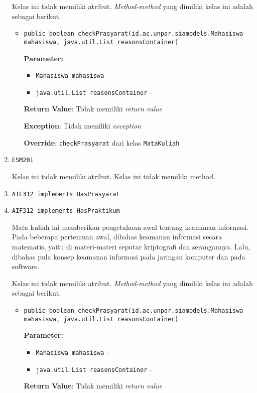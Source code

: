 \documentclass{article}
\begin{document}
\begin{enumerate}
Kelas ini tidak memiliki atribut. \textit{Method-method} yang dimiliki kelas ini adalah sebagai berikut.
\begin{itemize}
\item \texttt{public boolean checkPrasyarat(id.ac.unpar.siamodels.Mahasiswa mahasiswa, java.util.List reasonsContainer)}



\textbf{Parameter:}
\begin{itemize}
\item \texttt{Mahasiswa mahasiswa} - 
\item \texttt{java.util.List reasonsContainer} - 
\end{itemize}
\textbf{Return Value}: Tidak memiliki \textit{return value}

\textbf{Exception}: Tidak memiliki \textit{exception}

\textbf{Override}: \texttt{checkPrasyarat} dari kelas \texttt{MataKuliah}

\end{itemize}
\item \texttt{ESM201}



Kelas ini tidak memiliki atribut. Kelas ini tidak memiliki method. \item \texttt{AIF312 implements HasPrasyarat}

\item \texttt{AIF312 implements HasPraktikum}

Mata kuliah ini memberikan pengetahuan awal tentang keamanan informasi. Pada
 beberapa pertemuan awal, dibahas keamanan informasi secara matematis, yaitu
 di materi-materi seputar kriptografi dan serangannya. Lalu, dibahas pula
 konsep keamanan informasi pada jaringan komputer dan pada software.

Kelas ini tidak memiliki atribut. \textit{Method-method} yang dimiliki kelas ini adalah sebagai berikut.
\begin{itemize}
\item \texttt{public boolean checkPrasyarat(id.ac.unpar.siamodels.Mahasiswa mahasiswa, java.util.List reasonsContainer)}



\textbf{Parameter:}
\begin{itemize}
\item \texttt{Mahasiswa mahasiswa} - 
\item \texttt{java.util.List reasonsContainer} - 
\end{itemize}
\textbf{Return Value}: Tidak memiliki \textit{return value}


\end{itemize}
\end{enumerate}
\end{document}
